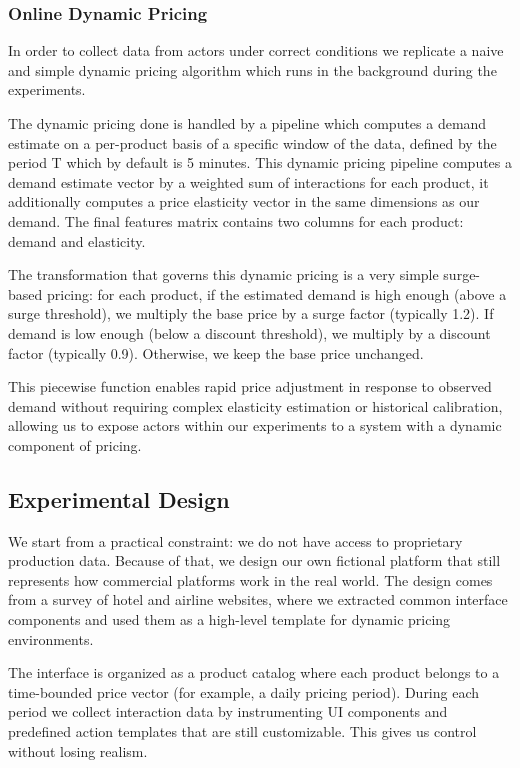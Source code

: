 \subsubsection{Online Dynamic Pricing}

In order to collect data from actors under correct conditions we replicate a naive and simple dynamic pricing algorithm which runs in the background during the experiments.

The dynamic pricing done is handled by a pipeline which computes a demand estimate on a per-product basis of a specific window of the data, defined by the period T which by default is 5 minutes. This dynamic pricing pipeline computes a demand estimate vector by a weighted sum of interactions for each product, it additionally computes a price elasticity vector in the same dimensions as our demand. The final features matrix contains two columns for each product: demand and elasticity.

The transformation that governs this dynamic pricing is a very simple surge-based pricing: for each product, if the estimated demand is high enough (above a surge threshold), we multiply the base price by a surge factor (typically 1.2). If demand is low enough (below a discount threshold), we multiply by a discount factor (typically 0.9). Otherwise, we keep the base price unchanged.

This piecewise function enables rapid price adjustment in response to observed demand without requiring complex elasticity estimation or historical calibration, allowing us to expose actors within our experiments to a system with a dynamic component of pricing.

\subsection{Experimental Design}

We start from a practical constraint: we do not have access to proprietary production data. Because of that, we design our own fictional platform that still represents how commercial platforms work in the real world. The design comes from a survey of hotel and airline websites, where we extracted common interface components and used them as a high-level template for dynamic pricing environments.

The interface is organized as a product catalog where each product belongs to a time-bounded price vector (for example, a daily pricing period). During each period we collect interaction data by instrumenting UI components and predefined action templates that are still customizable. This gives us control without losing realism.

